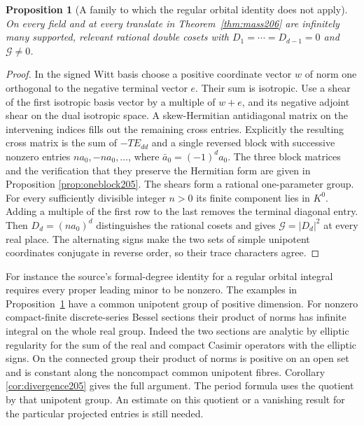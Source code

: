 \documentclass[a4paper,11pt]{article}
\newtheorem{proposition}{Proposition}[section]
\theoremstyle{definition}
\theoremstyle{remark}
\numberwithin{equation}{section}
\begin{document}
\begin{proposition}[A family to which the regular orbital identity does not apply]
\label{prop:oneblock206}
On every field and at every translate in Theorem~\ref{thm:mass206} are infinitely many supported, relevant rational double
cosets with \(D_1=\cdots=D_{d-1}=0\) and \(\mathcal G\ne0\).
\end{proposition}
\begin{proof}
In the signed Witt basis choose a positive coordinate vector \(w\)
of norm one orthogonal to the negative terminal vector \(e\).
Their sum is isotropic. Use a shear of the first isotropic basis
vector by a multiple of \(w+e\), and its negative adjoint shear
on the dual isotropic space. A skew-Hermitian antidiagonal matrix
on the intervening indices fills out the remaining cross entries.
Explicitly the resulting cross matrix is the sum of \(-TE_{dd}\)
and a single reversed block with successive nonzero entries
\(na_0,-na_0,\ldots\), where \(\bar a_0=(-1)^d a_0\).
The three block matrices and the verification that they preserve
the Hermitian form are given in
Proposition \ref{prop:oneblock205}.
The shears form a rational one-parameter group. For every sufficiently
divisible integer \(n>0\) its finite component lies in \(K^0\).
Adding a multiple of the first row to the last removes the terminal
diagonal entry. Then \(D_d=(na_0)^d\) distinguishes the rational
cosets and gives \(\mathcal G=|D_d|^2\) at every real place.
The alternating signs make the two sets of simple unipotent
coordinates conjugate in reverse order, so their trace characters
agree.
\end{proof}

For instance the source's formal-degree identity for a regular
orbital integral requires every proper leading minor to be nonzero.
The examples in Proposition~\ref{prop:oneblock206} have a common
unipotent group of positive dimension. For nonzero compact-finite
discrete-series Bessel sections their product of norms has infinite
integral on the whole real group. Indeed the two sections are analytic
by elliptic regularity for the sum of the real and compact Casimir
operators with the elliptic signs. On the connected group their
product of norms is positive on an open set and is constant along
the noncompact common unipotent fibres.
Corollary \ref{cor:divergence205}
gives the full argument. The period formula uses the quotient by
that unipotent group. An estimate on this quotient or a vanishing
result for the particular projected entries is still needed.
\end{document}
